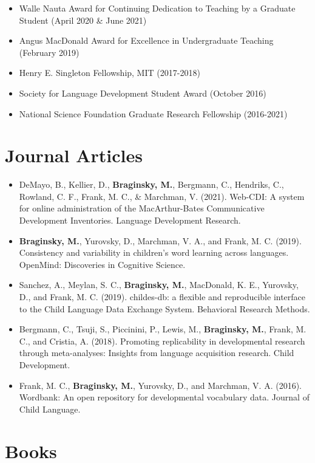\documentclass[11pt,]{article}
\providecommand{\tightlist}{%
  \setlength{\itemsep}{0pt}\setlength{\parskip}{0pt}}
\begin{document}
\begin{itemize}
\tightlist
\item
  Walle Nauta Award for Continuing Dedication to Teaching by a Graduate
  Student (April 2020 \& June 2021)
\item
  Angus MacDonald Award for Excellence in Undergraduate Teaching
  (February 2019)
\item
  Henry E. Singleton Fellowship, MIT (2017-2018)
\item
  Society for Language Development Student Award (October 2016)
\item
  National Science Foundation Graduate Research Fellowship (2016-2021)
\end{itemize}

\hypertarget{journal-articles}{%
\section{Journal Articles}\label{journal-articles}}

\begin{itemize}
\item
  DeMayo, B., Kellier, D., \textbf{Braginsky, M.}, Bergmann, C.,
  Hendriks, C., Rowland, C. F., Frank, M. C., \& Marchman, V. (2021).
  Web-CDI: A system for online administration of the MacArthur-Bates
  Communicative Development Inventories. Language Development Research.
\item
  \textbf{Braginsky, M.}, Yurovsky, D., Marchman, V. A., and Frank, M.
  C. (2019). Consistency and variability in children's word learning
  across languages. OpenMind: Discoveries in Cognitive Science.
\item
  Sanchez, A., Meylan, S. C., \textbf{Braginsky, M.}, MacDonald, K. E.,
  Yurovsky, D., and Frank, M. C. (2019). childes-db: a flexible and
  reproducible interface to the Child Language Data Exchange System.
  Behavioral Research Methods.
\item
  Bergmann, C., Tsuji, S., Piccinini, P., Lewis, M., \textbf{Braginsky,
  M.}, Frank, M. C., and Cristia, A. (2018). Promoting replicability in
  developmental research through meta-analyses: Insights from language
  acquisition research. Child Development.
\item
  Frank, M. C., \textbf{Braginsky, M.}, Yurovsky, D., and Marchman, V.
  A. (2016). Wordbank: An open repository for developmental vocabulary
  data. Journal of Child Language.
\end{itemize}

\hypertarget{books}{%
\section{Books}\label{books}}
\end{document}
